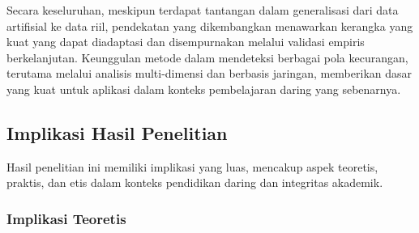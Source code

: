 Secara keseluruhan, meskipun terdapat tantangan dalam generalisasi dari data artifisial ke data riil, pendekatan yang dikembangkan menawarkan kerangka yang kuat yang dapat diadaptasi dan disempurnakan melalui validasi empiris berkelanjutan. Keunggulan metode dalam mendeteksi berbagai pola kecurangan, terutama melalui analisis multi-dimensi dan berbasis jaringan, memberikan dasar yang kuat untuk aplikasi dalam konteks pembelajaran daring yang sebenarnya.

\subsection{Implikasi Hasil Penelitian}
\label{subsec:implikasiHasilPenelitian}

Hasil penelitian ini memiliki implikasi yang luas, mencakup aspek teoretis, praktis, dan etis dalam konteks pendidikan daring dan integritas akademik.

\subsubsection{Implikasi Teoretis}


